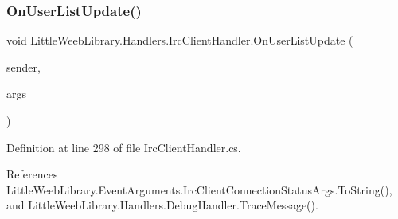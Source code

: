 \subsubsection{\texorpdfstring{On\+User\+List\+Update()}{OnUserListUpdate()}}
{\footnotesize\ttfamily void Little\+Weeb\+Library.\+Handlers.\+Irc\+Client\+Handler.\+On\+User\+List\+Update (\begin{DoxyParamCaption}\item[{object}]{sender,  }\item[{Irc\+User\+List\+Received\+Event\+Args}]{args }\end{DoxyParamCaption})\hspace{0.3cm}{\ttfamily [private]}}



Definition at line 298 of file Irc\+Client\+Handler.\+cs.



References Little\+Weeb\+Library.\+Event\+Arguments.\+Irc\+Client\+Connection\+Status\+Args.\+To\+String(), and Little\+Weeb\+Library.\+Handlers.\+Debug\+Handler.\+Trace\+Message().


